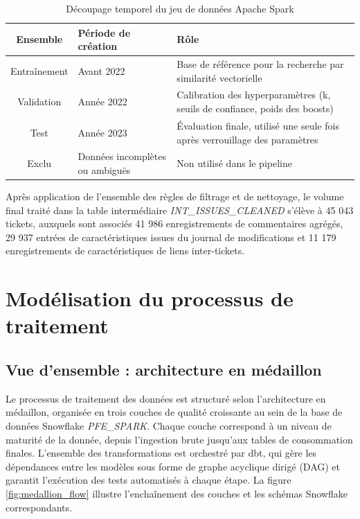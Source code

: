 \begin{table}[h!]
\centering
\begin{tabularx}{\textwidth}{|c|X|X|}
  \hline
  \textbf{Ensemble} & \textbf{Période de création} & \textbf{Rôle} \\
  \hline
  Entraînement & Avant 2022 & Base de référence pour la recherche par similarité vectorielle \\
  \hline
  Validation & Année 2022 & Calibration des hyperparamètres (k, seuils de confiance, poids des boosts) \\
  \hline
  Test & Année 2023 & Évaluation finale, utilisé une seule fois après verrouillage des paramètres \\
  \hline
  Exclu & Données incomplètes ou ambiguës & Non utilisé dans le pipeline \\
  \hline
\end{tabularx}
\caption{Découpage temporel du jeu de données Apache Spark}
\label{tab:split}
\end{table}

Après application de l'ensemble des règles de filtrage et de nettoyage, le volume final traité dans la table intermédiaire \textit{INT\_ISSUES\_CLEANED} s'élève à 45 043 tickets, auxquels sont associés 41 986 enregistrements de commentaires agrégés, 29 937 entrées de caractéristiques issues du journal de modifications et 11 179 enregistrements de caractéristiques de liens inter-tickets.

\section{Modélisation du processus de traitement}

\subsection{Vue d'ensemble : architecture en médaillon}

Le processus de traitement des données est structuré selon l'architecture en médaillon, organisée en trois couches de qualité croissante au sein de la base de données Snowflake \textit{PFE\_SPARK}. Chaque couche correspond à un niveau de maturité de la donnée, depuis l'ingestion brute jusqu'aux tables de consommation finales. L'ensemble des transformations est orchestré par dbt, qui gère les dépendances entre les modèles sous forme de graphe acyclique dirigé (DAG) et garantit l'exécution des tests automatisés à chaque étape. La figure \ref{fig:medallion_flow} illustre l'enchaînement des couches et les schémas Snowflake correspondants.

